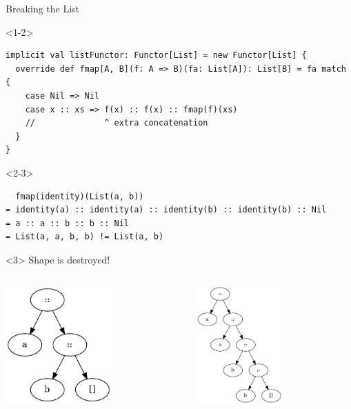 \documentclass[presentation,aspectratio=169,smaller]{beamer}
\begin{document}
\begin{frame}[label={sec:org2312ea5},fragile,t]{Breaking the List}
 \begin{onlyenv}<1-2>
\begin{verbatim}
implicit val listFunctor: Functor[List] = new Functor[List] {
  override def fmap[A, B](f: A => B)(fa: List[A]): List[B] = fa match {
    case Nil => Nil
    case x :: xs => f(x) :: f(x) :: fmap(f)(xs)
    //              ^ extra concatenation
  }
}
\end{verbatim}
\end{onlyenv}

\begin{onlyenv}<2-3>
\begin{verbatim}
  fmap(identity)(List(a, b))
= identity(a) :: identity(a) :: identity(b) :: identity(b) :: Nil
= a :: a :: b :: b :: Nil
= List(a, a, b, b) != List(a, b)
\end{verbatim}
\end{onlyenv}

\begin{onlyenv}<3>
Shape is destroyed!

\begin{columns}
\begin{column}[t]{0.5\columnwidth}
\begin{center}
\includegraphics[height=4.5cm]{.dot/functor-list-broken-1.png}
\end{center}
\end{column}

\begin{column}[t]{0.5\columnwidth}
\begin{center}
\includegraphics[height=4.5cm]{.dot/functor-list-broken-2.png}
\end{center}
\end{column}
\end{columns}
\end{onlyenv}
\end{frame}
\end{document}
